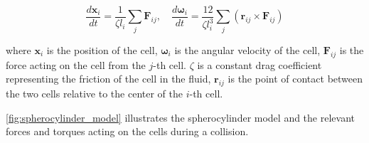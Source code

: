 \documentclass[conference]{IEEEtran}
\begin{document}
\begin{equation}
    \frac{d \mathbf{x}_i}{dt} = \frac{1}{\zeta l_i} \sum_j \mathbf{F}_{ij}, \quad \frac{d \mathbf{\omega}_i}{dt} = \frac{12}{\zeta l_i^3} \sum_j (\mathbf{r}_{ij} \times \mathbf{F}_{ij})
\end{equation}
\label{eq:overdamped_langevin}

where $\mathbf{x}_i$ is the position of the cell, $\mathbf{\omega}_i$ is the angular velocity of the cell, $\mathbf{F}_{ij}$ is the force acting on the cell from the $j$-th cell. $\zeta$ is a constant drag coefficient representing the friction of the cell in the fluid, $\mathbf{r}_{ij}$ is the point of contact between the two cells relative to the center of the $i$-th cell.

\autoref{fig:spherocylinder_model} illustrates the spherocylinder model and the relevant forces and torques acting on the cells during a collision.
\end{document}
